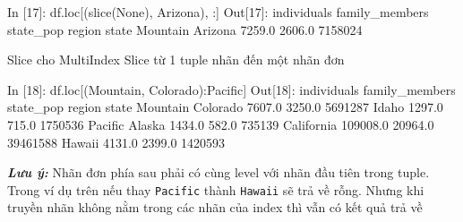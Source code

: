 \documentclass[
]{book}
\makeatletter
\newenvironment{Shaded}{\begin{snugshade}}{\end{snugshade}}
\newcommand{\BuiltInTok}[1]{#1}
\newcommand{\DecValTok}[1]{\textcolor[rgb]{0.00,0.00,0.81}{#1}}
\newcommand{\FloatTok}[1]{\textcolor[rgb]{0.00,0.00,0.81}{#1}}
\newcommand{\NormalTok}[1]{#1}
\newcommand{\StringTok}[1]{\textcolor[rgb]{0.31,0.60,0.02}{#1}}
\newcommand{\VariableTok}[1]{\textcolor[rgb]{0.00,0.00,0.00}{#1}}
\newenvironment{kframe}{%
\medskip{}
\setlength{\fboxsep}{.8em}
 \def\at@end@of@kframe{}%
 \ifinner\ifhmode%
  \def\at@end@of@kframe{\end{minipage}}%
  \begin{minipage}{\columnwidth}%
 \fi\fi%
 \def\FrameCommand##1{\hskip\@totalleftmargin \hskip-\fboxsep
 \colorbox{shadecolor}{##1}\hskip-\fboxsep
     \hskip-\linewidth \hskip-\@totalleftmargin \hskip\columnwidth}%
 \MakeFramed {\advance\hsize-\width
   \@totalleftmargin\z@ \linewidth\hsize
   \@setminipage}}%
 {\par\unskip\endMakeFramed%
 \at@end@of@kframe}
\newenvironment{rmdblock}[1]
  {
  \begin{itemize}
  \renewcommand{\labelitemi}{
    \raisebox{-.7\height}[0pt][0pt]{
      {\setkeys{Gin}{width=3em,keepaspectratio}\texttt{[image: images/\#1]}}
    }
  }
  \setlength{\fboxsep}{1em}
  \begin{kframe}
  \item
  }
  {
  \end{kframe}
  \end{itemize}
  }
\newenvironment{rmdnote}
  {\begin{rmdblock}{note}}
  {\end{rmdblock}}
\makeatother
\begin{document}
\begin{Shaded}
\begin{Highlighting}[]
\NormalTok{In [}\DecValTok{17}\NormalTok{]: df.loc[(}\BuiltInTok{slice}\NormalTok{(}\VariableTok{None}\NormalTok{), }\StringTok{\textquotesingle{}Arizona\textquotesingle{}}\NormalTok{), :]}
\NormalTok{Out[}\DecValTok{17}\NormalTok{]:}
\NormalTok{                  individuals  family\_members  state\_pop}
\NormalTok{region   state                                          }
\NormalTok{Mountain Arizona       }\FloatTok{7259.0}          \FloatTok{2606.0}    \DecValTok{7158024}
\end{Highlighting}
\end{Shaded}

Slice cho MultiIndex
Slice từ 1 tuple nhãn đến một nhãn đơn

\begin{Shaded}
\begin{Highlighting}[]
\NormalTok{In [}\DecValTok{18}\NormalTok{]: df.loc[(}\StringTok{\textquotesingle{}Mountain\textquotesingle{}}\NormalTok{, }\StringTok{\textquotesingle{}Colorado\textquotesingle{}}\NormalTok{):}\StringTok{\textquotesingle{}Pacific\textquotesingle{}}\NormalTok{]}
\NormalTok{Out[}\DecValTok{18}\NormalTok{]:}
\NormalTok{                     individuals  family\_members  state\_pop}
\NormalTok{region   state                                             }
\NormalTok{Mountain Colorado         }\FloatTok{7607.0}          \FloatTok{3250.0}    \DecValTok{5691287}
\NormalTok{         Idaho            }\FloatTok{1297.0}           \FloatTok{715.0}    \DecValTok{1750536}
\NormalTok{Pacific  Alaska           }\FloatTok{1434.0}           \FloatTok{582.0}     \DecValTok{735139}
\NormalTok{         California     }\FloatTok{109008.0}         \FloatTok{20964.0}   \DecValTok{39461588}
\NormalTok{         Hawaii           }\FloatTok{4131.0}          \FloatTok{2399.0}    \DecValTok{1420593}
\end{Highlighting}
\end{Shaded}

\begin{rmdnote}
\textbf{\emph{Lưu ý:}}
Nhãn đơn phía sau phải có cùng level với nhãn đầu tiên trong tuple. Trong ví dụ trên nếu thay \texttt{Pacific} thành \texttt{Hawaii} sẽ trả về rỗng. Nhưng khi truyền nhãn không nằm trong các nhãn của index thì vẫn có kết quả trả về
\end{rmdnote}
\end{document}
